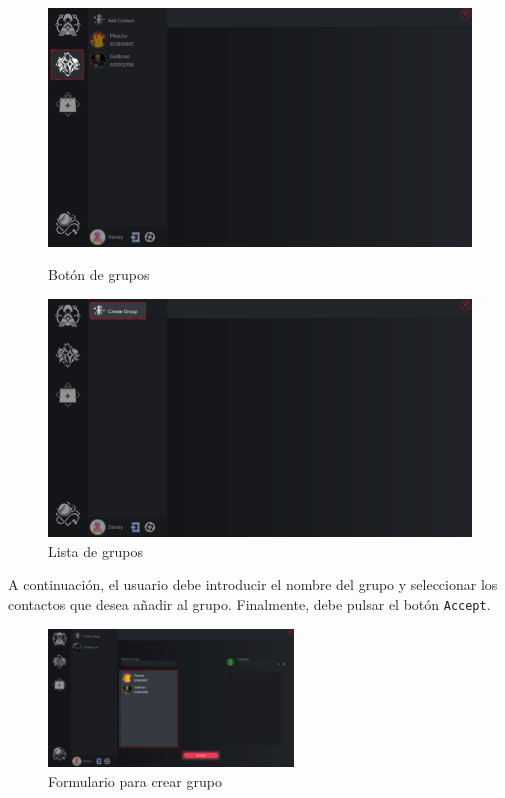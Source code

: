 \begin{figure}[H]
    \centering
    \begin{minipage}[b]{0.48\textwidth}
        \centering
        \includegraphics[width=\textwidth]{images/manualDeUsuario/HacerGrupo1.png}
        \caption*{Botón de grupos}
    \end{minipage}
    \hfill
    \begin{minipage}[b]{0.48\textwidth}
        \centering
        \includegraphics[width=\textwidth]{images/manualDeUsuario/HacerGrupo2.png}
        \caption*{Lista de grupos}
    \end{minipage}
\end{figure}

A continuación, el usuario debe introducir el nombre del grupo y seleccionar los contactos que desea añadir al grupo. Finalmente, debe pulsar el botón \texttt{Accept}.

\begin{figure}[H]
    \centering
    \includegraphics[width=0.58\textwidth]{images/manualDeUsuario/HacerGrupo3.png}
    \caption*{Formulario para crear grupo}
\end{figure}

